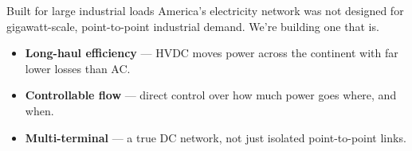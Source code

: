 
\begin{frame}{Built for large industrial loads}
  America's electricity network was not designed for gigawatt-scale,
  point-to-point industrial demand. We're building one that is.

  \vspace{0.8em}
  \begin{itemize}
    \setlength{\itemsep}{0.6em}
    \item \textbf{Long-haul efficiency} --- HVDC moves power across the
          continent with far lower losses than AC.
    \item \textbf{Controllable flow} --- direct control over how much power
          goes where, and when.
    \item \textbf{Multi-terminal} --- a true DC network, not just isolated
          point-to-point links.
  \end{itemize}
\end{frame}
